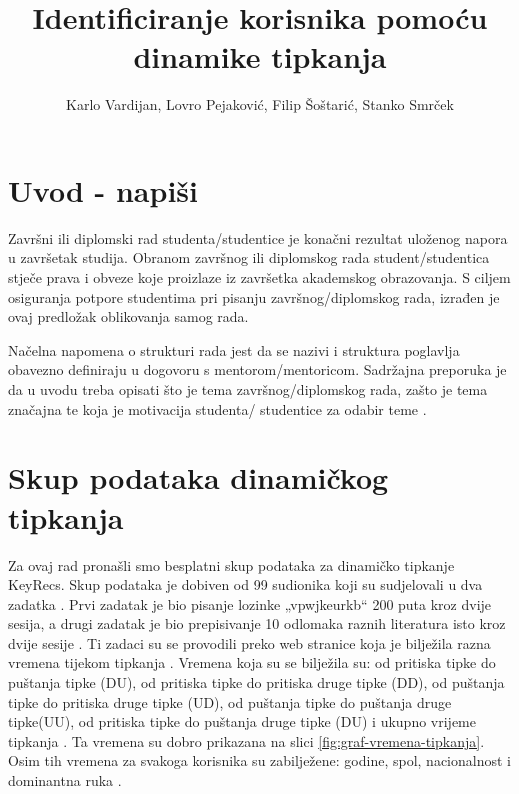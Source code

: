 \documentclass[]{foi}
\title{Identificiranje korisnika pomoću dinamike tipkanja}
\author{Karlo Vardijan, Lovro Pejaković, Filip Šoštarić, Stanko Smrček}
\begin{document}
\maketitle

\tableofcontents

\makeatletter {} \makeatother
\pagestyle{plain}



\chapter{Uvod - napiši}

Završni ili diplomski rad studenta/studentice je konačni rezultat uloženog napora u završetak studija. Obranom završnog ili diplomskog rada student/studentica stječe prava i obveze koje proizlaze iz završetka akademskog obrazovanja. S ciljem osiguranja potpore studentima pri pisanju završnog/diplomskog rada, izrađen je ovaj predložak oblikovanja samog rada.

Načelna napomena o strukturi rada jest da se nazivi i struktura poglavlja obavezno definiraju u dogovoru s mentorom/mentoricom. Sadržajna preporuka je da u uvodu treba opisati što je tema završnog/diplomskog rada, zašto je tema značajna te koja je motivacija studenta/ studentice za odabir teme \cite{oraictolic2011AkademskoPismoStrategije}.


\chapter{Skup podataka dinamičkog tipkanja}
Za ovaj rad pronašli smo besplatni skup podataka za dinamičko tipkanje KeyRecs. Skup podataka je dobiven od 99 sudionika koji su sudjelovali u dva zadatka  \cite{Dias2023}. Prvi zadatak je bio pisanje lozinke „vpwjkeurkb“ 200 puta kroz dvije sesija, a drugi zadatak je bio prepisivanje 10 odlomaka raznih literatura isto kroz dvije sesije \cite{Dias2023}. Ti zadaci su se provodili preko web stranice koja je bilježila razna vremena tijekom tipkanja \cite{Dias2023}. Vremena koja su se bilježila su: od pritiska tipke do puštanja tipke (DU), od pritiska tipke do pritiska druge tipke (DD), od puštanja tipke do pritiska druge tipke (UD), od puštanja tipke do puštanja druge tipke(UU), od pritiska tipke do puštanja druge tipke (DU) i ukupno vrijeme tipkanja \cite{Dias2023}. Ta vremena su dobro prikazana na slici \ref{fig:graf-vremena-tipkanja}. Osim tih vremena za svakoga korisnika su  zabilježene: godine, spol, nacionalnost i dominantna ruka  \cite{Dias2023}.
\end{document}
